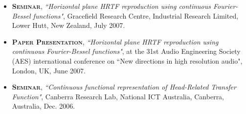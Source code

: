 \documentclass[11pt]{article}
\begin{document}
\begin{itemize}
\item \textsc{\textbf{Seminar}},
\emph{``Horizontal plane HRTF reproduction using continuous Fourier-Bessel functions"}, Gracefield Research
Centre, Industrial Research Limited, Lower Hutt, New Zealand, July 2007.

\item \textsc{\textbf{Paper Presentation}},
\emph{``Horizontal plane HRTF reproduction using continuous Fourier-Bessel functions"}, at the 31st Audio
Engineering Society (AES) international conference on ``New directions in high resolution audio", London, UK,
June 2007.

\item \textsc{\textbf{Seminar}},
\emph{``Continuous functional representation of Head-Related Transfer Function"}, Canberra Research Lab,
National ICT Australia, Canberra, Australia, Dec. 2006.

\end{itemize}

\end{document}
